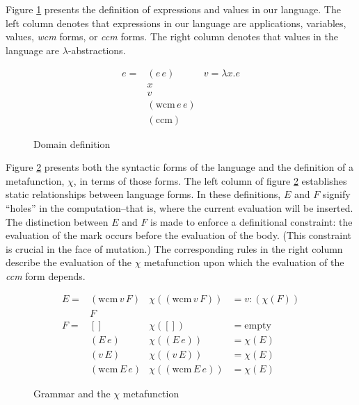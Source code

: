 \documentclass[ms]{byuprop}
\newcounter{definition}
\begin{document}
Figure \ref{domain-definition} presents the definition of expressions and values in our 
language. The left column denotes that expressions in our language are applications, variables, 
values, \emph{wcm} forms, or \emph{ccm} forms. The right column denotes that values in the 
language are $\lambda$-abstractions.

\begin{figure}
\begin{align*}
e = &(e\,e) & v = \lambda x. e\\
    &x\\
    &v\\
    &(\mathrm{wcm}\,e\,e)\\
    &(\mathrm{ccm})
\end{align*}
\caption{Domain definition}
\label{domain-definition}
\end{figure}

Figure \ref{language-definition} presents both the syntactic forms of the language and the 
definition of a metafunction, $\chi$, in terms of those forms. The left column of figure 
\ref{language-definition} establishes static relationships between language forms. In these 
definitions, $E$ and $F$ signify ``holes'' in the computation--that is, where the current 
evaluation will be inserted. The distinction between $E$ and $F$ is made to enforce a 
definitional constraint: the evaluation of the mark occurs before the evaluation of the 
body. (This constraint is crucial in the face of mutation.) The corresponding rules in the 
right column describe the evaluation of the $\chi$ metafunction upon which the evaluation 
of the \emph{ccm} form depends.

\begin{figure}
\begin{align*}
E = &(\mathrm{wcm}\,v\,F) & \chi((\mathrm{wcm}\,v\,F)) &= v : (\chi(F))\\
    &F\\
F = &[]                   & \chi([])                   &= \mathrm{empty}\\
    &(E\,e)               & \chi((E\,e))               &= \chi(E)\\
    &(v\,E)               & \chi((v\,E))               &= \chi(E)\\
    &(\mathrm{wcm}\,E\,e) & \chi((\mathrm{wcm}\,E\,e)) &= \chi(E)
\end{align*}
\caption{Grammar and the $\chi$ metafunction}
\label{language-definition}
\end{figure}
\end{document}
